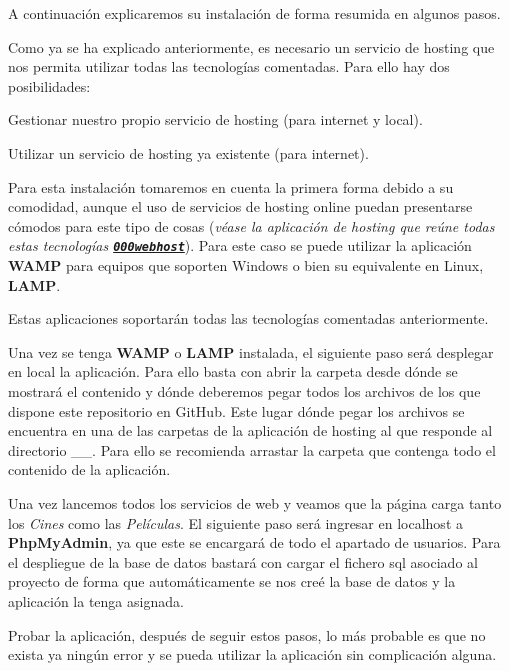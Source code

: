 A continuación explicaremos su instalación de forma resumida en algunos pasos.


\begin{DoxyEnumerate}
\item Como ya se ha explicado anteriormente, es necesario un servicio de hosting que nos permita utilizar todas las tecnologías comentadas. Para ello hay dos posibilidades\+:
\begin{DoxyItemize}
\item Gestionar nuestro propio servicio de hosting (para internet y local).
\item Utilizar un servicio de hosting ya existente (para internet).
\end{DoxyItemize}

Para esta instalación tomaremos en cuenta la primera forma debido a su comodidad, aunque el uso de servicios de hosting online puedan presentarse cómodos para este tipo de cosas ({\itshape véase la aplicación de hosting que reúne todas estas tecnologías \href{https://www.000webhost.com/}{\texttt{ {\bfseries{000webhost}}}}}). Para este caso se puede utilizar la aplicación {\bfseries{W\+A\+MP}} para equipos que soporten Windows o bien su equivalente en Linux, {\bfseries{L\+A\+MP}}.

Estas aplicaciones soportarán todas las tecnologías comentadas anteriormente.
\item Una vez se tenga {\bfseries{W\+A\+MP}} o {\bfseries{L\+A\+MP}} instalada, el siguiente paso será desplegar en local la aplicación. Para ello basta con abrir la carpeta desde dónde se mostrará el contenido y dónde deberemos pegar todos los archivos de los que dispone este repositorio en Git\+Hub. Este lugar dónde pegar los archivos se encuentra en una de las carpetas de la aplicación de hosting al que responde al directorio \+\_\+\_\+. Para ello se recomienda arrastar la carpeta que contenga todo el contenido de la aplicación.
\item Una vez lancemos todos los servicios de web y veamos que la página carga tanto los {\itshape Cines} como las {\itshape Películas}. El siguiente paso será ingresar en {\ttfamily localhost} a {\bfseries{Php\+My\+Admin}}, ya que este se encargará de todo el apartado de usuarios. Para el despliegue de la base de datos bastará con cargar el fichero sql asociado al proyecto de forma que automáticamente se nos creé la base de datos y la aplicación la tenga asignada.
\item Probar la aplicación, después de seguir estos pasos, lo más probable es que no exista ya ningún error y se pueda utilizar la aplicación sin complicación alguna.
\end{DoxyEnumerate}

